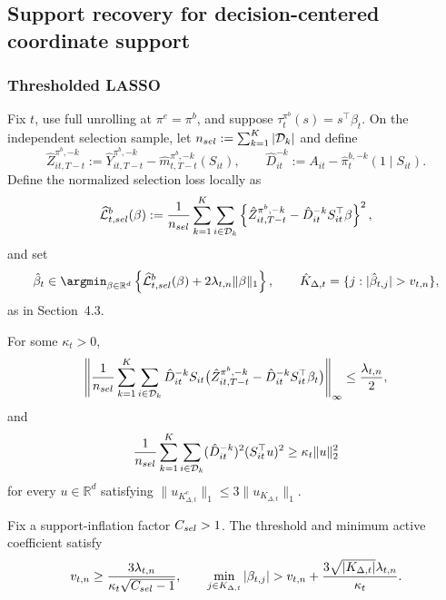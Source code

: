 \documentclass[opre,nonblindrev]{informs4}
\newenvironment{revision}{\begingroup\color{revisionblue}\ignorespaces}{\endgroup}
\let\arxivSavedArgmin\argmin
\let\argmin\undefined
\let\argmin\arxivSavedArgmin
\newcommand{\norm}[1]{\lVert#1\rVert}
\newcommand{\blipadv}{\tau}
\begin{document}
\begin{revision}
    
\subsection{Support recovery for decision-centered coordinate support}

\subsubsection{Thresholded LASSO}

Fix $t$, use full unrolling at $\pi^e=\pi^b$, and suppose
$\blipadv_t^{\pi^b}(s)=s^\top\beta_t$. On the independent selection sample,
let $n_{\rm sel}:=\sum_{k=1}^K|\mathcal D_k|$ and define
\[
\hat Z_{it,T-t}^{\pi^b,-k}
:=
\hat Y_{it,T-t}^{\pi^b,-k}
-
\hat m_{t,T-t}^{\pi^b,-k}(S_{it}),
\qquad
\hat D_{it}^{-k}
:=
A_{it}-\hat\pi_t^{b,-k}(1\mid S_{it}).
\]
Define the normalized selection loss locally as
\[
\widehat{\mathcal L}^{b}_{t,\rm sel}(\beta)
:=
\frac{1}{n_{\rm sel}}
\sum_{k=1}^{K}\sum_{i\in\mathcal D_k}
\left\{
\hat Z_{it,T-t}^{\pi^b,-k}
-
\hat D_{it}^{-k}S_{it}^{\top}\beta
\right\}^{2},
\]
and set
\[
\hat\beta_t
\in
\argmin_{\beta\in\mathbb R^d}
\left\{
\widehat{\mathcal L}^{b}_{t,\rm sel}(\beta)
+2\lambda_{t,n}\norm{\beta}_1
\right\},
\qquad
\hat K_{\Delta,t}
=
\{j:|\hat\beta_{t,j}|>v_{t,n}\},
\]
as in Section~4.3.

\begin{assumption}\label{ass:tl-score-re}
For some $\kappa_t>0$,
\begin{equation}
\left\norm{
\frac{1}{n_{\rm sel}}
\sum_{k=1}^K\sum_{i\in\mathcal D_k}
\hat D_{it}^{-k}S_{it}
\bigl(\hat Z_{it,T-t}^{\pi^b,-k}-\hat D_{it}^{-k}S_{it}^\top\beta_t\bigr)
\right}_\infty
\le \frac{\lambda_{t,n}}{2},
\label{eq:tl-score-ec}
\end{equation}
and
\begin{equation}
\frac{1}{n_{\rm sel}}
\sum_{k=1}^K\sum_{i\in\mathcal D_k}
(\hat D_{it}^{-k})^2(S_{it}^\top u)^2
\ge \kappa_t\norm{u}_2^2
\label{eq:tl-re-ec}
\end{equation}
for every $u\in\mathbb R^d$ satisfying
$\norm{u_{K_{\Delta,t}^c}}_1\le3\norm{u_{K_{\Delta,t}}}_1$.
\end{assumption}

\begin{assumption}\label{ass:tl-betamin}
Fix a support-inflation factor $C_{\rm sel}>1$. The threshold and minimum active coefficient satisfy
\[
v_{t,n}
\ge
\frac{3\lambda_{t,n}}{\kappa_t\sqrt{C_{\rm sel}-1}},
\qquad
\min_{j\in K_{\Delta,t}}|\beta_{t,j}|
>
v_{t,n}
+\frac{3\sqrt{|K_{\Delta,t}|}\lambda_{t,n}}{\kappa_t}.
\]
\end{assumption}


\end{revision}
\end{document}
